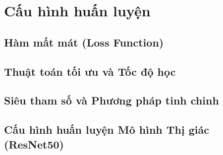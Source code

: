 \section{Cấu hình huấn luyện}

\subsection{Hàm mất mát (Loss Function)}

\subsection{Thuật toán tối ưu và Tốc độ học}

\subsection{Siêu tham số và Phương pháp tinh chỉnh}

\subsection{Cấu hình huấn luyện Mô hình Thị giác (ResNet50)}

\clearpage
